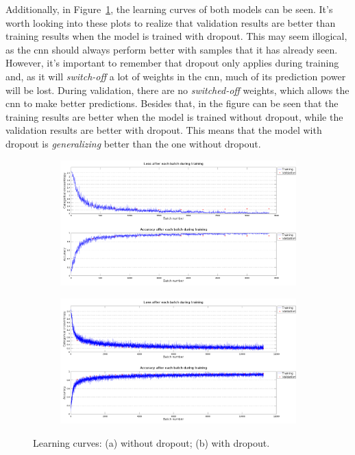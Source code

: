 Additionally, in Figure~\ref{fig:lc_dropout}, the learning curves of both models can be seen. It's worth looking into these plots to realize that validation results are better than training results when the model is trained with dropout. This may seem illogical, as the \gls{cnn} should always perform better with samples that it has already seen. However, it's important to remember that dropout only applies during training and, as it will \textit{switch-off} a lot of weights in the \gls{cnn}, much of its prediction power will be lost. During validation, there are no \textit{switched-off} weights, which allows the \gls{cnn} to make better predictions. Besides that, in the figure can be seen that the training results are better when the model is trained without dropout, while the validation results are better with dropout. This means that the model with dropout is \emph{generalizing} better than the one without dropout. 
\begin{figure}
	\begin{subfigure}{1\textwidth}
		\centering
		\includegraphics[width=1\linewidth]{figures/lc_nodropout.png}
		\caption{}
	\end{subfigure}
	\begin{subfigure}{1\textwidth}
		\centering
		\includegraphics[width=1\linewidth]{figures/lc_dropout.png}
		\caption{}
	\end{subfigure}
	\caption{Learning curves: (a) without dropout; (b) with dropout.}
	\label{fig:lc_dropout}
\end{figure}

